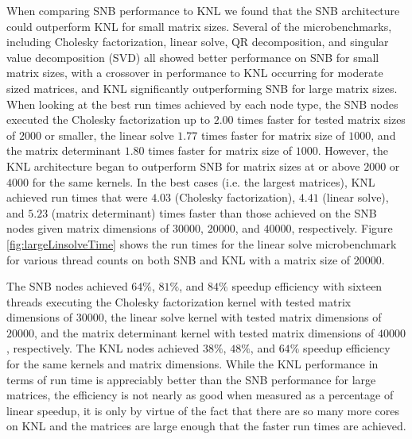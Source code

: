 When comparing SNB performance to KNL we found that the SNB architecture could outperform
KNL for small matrix sizes. Several of the microbenchmarks, including Cholesky
factorization, linear solve, QR decomposition, and singular value decomposition (SVD) all
showed better performance on SNB for small matrix sizes, with a crossover in performance
to KNL occurring for moderate sized matrices, and KNL significantly outperforming SNB for
large matrix sizes. When looking at the best run times achieved by each node type, the SNB
nodes executed the Cholesky factorization up to $2.00$ times faster for tested matrix
sizes of $2000$ or smaller, the linear solve $1.77$ times faster for matrix size of
$1000$, and the matrix determinant $1.80$ times faster for matrix size of $1000$. However,
the KNL architecture began to outperform SNB for matrix sizes at or above $2000$ or $4000$
for the same kernels. In the best cases (i.e. the largest matrices), KNL achieved run
times that were $4.03$ (Cholesky factorization), $4.41$ (linear solve), and $5.23$ (matrix
determinant) times faster than those achieved on the SNB nodes given matrix dimensions of
$30000$, $20000$, and $40000$, respectively. Figure \ref{fig:largeLinsolveTime} shows the
run times for the linear solve microbenchmark for various thread counts on both SNB and
KNL with a matrix size of $20000$.

The SNB nodes achieved $64\%$, $81\%$, and $84\%$ speedup efficiency with sixteen threads
executing the Cholesky factorization kernel with tested matrix dimensions of $30000$, the
linear solve kernel with tested matrix dimensions of $20000$, and the matrix determinant
kernel with tested matrix dimensions of $40000$, respectively.
The KNL nodes achieved $38\%$, $48\%$, and $64\%$ speedup efficiency
for the same kernels and matrix dimensions. While the KNL performance in terms of
run time is appreciably better than the SNB performance for large matrices, the efficiency
is not nearly as good when measured as a percentage of linear speedup, it is only by
virtue of the fact that there are so many more cores on KNL and the matrices are large
enough that the faster run times are achieved.

